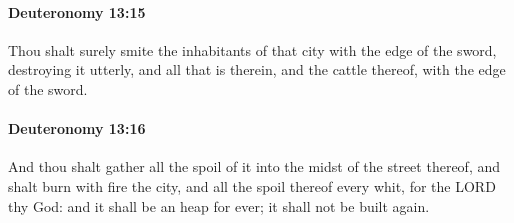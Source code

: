 		\paragraph{Deuteronomy 13:15} %
			\label{DEUTERONOMY-13-15}

			Thou shalt surely smite the inhabitants of that city with the edge of the sword, destroying it utterly, and all that is therein, and the cattle thereof, with the edge of the sword.


		\paragraph{Deuteronomy 13:16} %
			\label{DEUTERONOMY-13-16}

			And thou shalt gather all the spoil of it into the midst of the street thereof, and shalt burn with fire the city, and all the spoil thereof every whit, for the LORD thy God: and it shall be an heap for ever; it shall not be built again.

